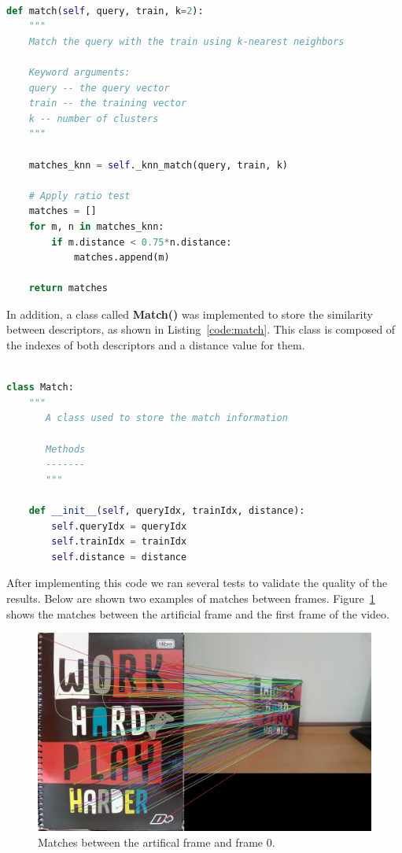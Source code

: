 \documentclass[]{IEEEtran}
\begin{document}
\begin{lstlisting}[language=Python, caption={Matching Lowe's Criteria}, label={code:matching}]

def match(self, query, train, k=2):
    """
    Match the query with the train using k-nearest neighbors

    Keyword arguments:
    query -- the query vector
    train -- the training vector
    k -- number of clusters
    """

    matches_knn = self._knn_match(query, train, k)

    # Apply ratio test
    matches = []
    for m, n in matches_knn:
        if m.distance < 0.75*n.distance:
            matches.append(m)

    return matches

\end{lstlisting}

In addition, a class called \textbf{Match()} was implemented to store the similarity between descriptors, as shown in Listing~\ref{code:match}. This class is composed of the indexes of both descriptors and a distance value for them.

\begin{lstlisting}[language=Python, caption={Match Class}, label={code:match}]

class Match:
    """
       A class used to store the match information

       Methods
       -------
       """

    def __init__(self, queryIdx, trainIdx, distance):
        self.queryIdx = queryIdx
        self.trainIdx = trainIdx
        self.distance = distance

\end{lstlisting}

After implementing this code we ran several tests to validate the quality of the results. Below are shown two examples of matches between frames. Figure~\ref{fig:matches_0} shows the matches between the artificial frame and the first frame of the video.

\begin{figure}[H]
     \centering
     \includegraphics[width=0.9\hsize]{img/matches_0.jpg}
     \caption{Matches between the artifical frame and frame 0.}
     \label{fig:matches_0}
\end{figure}
\end{document}
